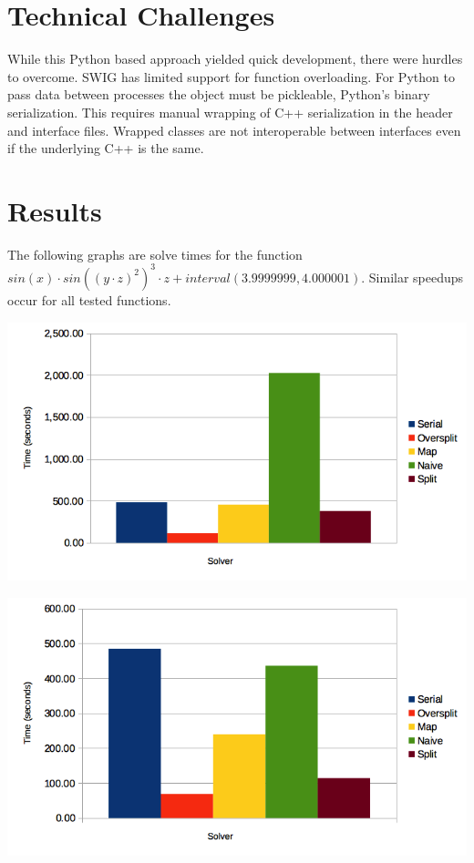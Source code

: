 \documentclass{acm_proc_article-sp}
\begin{document}
\section{Technical Challenges}
While this Python based approach yielded quick development, there were hurdles to overcome. SWIG has limited support for function overloading. For Python to pass data between processes the object must be pickleable, Python's binary serialization. This requires manual wrapping of C++ serialization in the header and interface files. Wrapped classes are not interoperable between interfaces even if the underlying C++ is the same. 

\section{Results}
The following graphs are solve times for the function $sin(x)\cdot {sin({(y\cdot z)}^2)}^{3}\cdot z+interval(3.9999999,4.000001)$. Similar speedups occur for all tested functions.

\begin{centering}
\includegraphics[width=.9\linewidth]{t1}

\includegraphics[width=.9\linewidth]{t44}
\end{centering}
\end{document}
